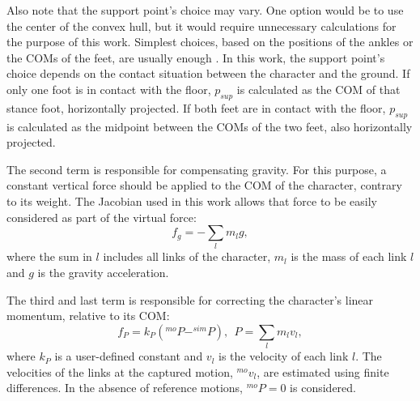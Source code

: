 \documentclass[tog]{acmsiggraph}
\begin{document}
Also note that the support point's choice may vary.
One option would be to use the center of the convex hull, but it would require unnecessary calculations for the purpose of this work.
Simplest choices, based on the positions of the ankles or the COMs of the feet, are usually enough \cite{bib:Abe07} \cite{bib:Geijtenbeek12}. %
%
In this work, the support point's choice depends on the contact situation between the character and the ground. %
If only one foot is in contact with the floor, $p_{sup}$ is calculated as the COM of that stance foot, horizontally projected.
If both feet are in contact with the floor, $p_{sup}$ is calculated as the midpoint between the COMs of the two feet, also horizontally projected.


The second term is responsible for compensating gravity. For this purpose, a constant vertical force should be applied to the COM of the character,
contrary to its weight. The Jacobian used in this work allows that force to be easily considered as part of the virtual force:
%
\begin{equation}
  f_{g} = -\sum_l m_{l} g,
\end{equation}
%
where the sum in $l$ includes all links of the character, $m_{l}$ is the mass of each link $l$ and $g$ is the gravity acceleration.

The third and last term is responsible for correcting the character's linear momentum, relative to its COM: %
%
\begin{equation}
  f_{P} = k_{P} (^{mo}P - ^{sim}P), ~~
  P = \sum_l m_{l} v_{l},
\label{eq:momentoli}
\end{equation}
%
where $k_{P}$ is a user-defined constant and $v_{l}$ is the velocity of each link $l$.
The velocities of the links at the captured motion, $^{mo}v_{l}$, are estimated using finite differences. %
In the absence of reference motions, $^{mo}P = 0$ is considered.
\end{document}
